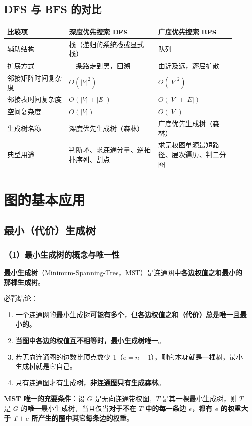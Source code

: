 \documentclass[11pt,openany,UTF8]{ctexbook}
\begin{document}
\subsection{DFS 与 BFS 的对比}

\begingroup\small\setlength{\tabcolsep}{4.0pt}
\begin{longtable}{@{}L{0.2516\linewidth}L{0.3654\linewidth}L{0.3115\linewidth}@{}}
\toprule
\textbf{比较项} & \textbf{深度优先搜索 DFS} & \textbf{广度优先搜索 BFS} \\
\midrule
\endhead
辅助结构 & 栈（递归的系统栈或显式栈） & 队列 \\
扩展方式 & 一条路走到黑，回溯 & 由近及远，逐层扩散 \\
邻接矩阵时间复杂度 & $O(\lvert V\rvert^{2})$ & $O(\lvert V\rvert^{2})$ \\
邻接表时间复杂度 & $O(\lvert V\rvert+\lvert E\rvert)$ & $O(\lvert V\rvert+\lvert E\rvert)$ \\
空间复杂度 & $O(\lvert V\rvert)$ & $O(\lvert V\rvert)$ \\
生成树名称 & 深度优先生成树（森林） & 广度优先生成树（森林） \\
典型用途 & 判断环、求连通分量、逆拓扑序列、割点 & 求无权图单源最短路径、层次遍历、判二分图 \\
\bottomrule
\end{longtable}
\endgroup

\section{图的基本应用}

\subsection{最小（代价）生成树}

\subsubsection{（1）最小生成树的概念与唯一性}

\textbf{最小生成树}（Minimum-Spanning-Tree，MST）是连通网中\textbf{各边权值之和最小的那棵生成树}。

必背结论：

\begin{enumerate}
\item 一个连通网的最小生成树\textbf{可能有多个}，但\textbf{各边权值之和（代价）总是唯一且最小的}。
\item \textbf{当图中各边的权值互不相等时，最小生成树唯一}。
\item 若无向连通图的边数比顶点数少 1（$e=n-1$），则它本身就是一棵树，最小生成树就是它自己。
\item 只有连通图才有生成树，\textbf{非连通图只有生成森林}。
\end{enumerate}
\textbf{MST 唯一的充要条件}：设 $G$ 是无向连通带权图，$T$ 是其一棵最小生成树，则 $T$ 是 $G$ 的\textbf{唯一}最小生成树，当且仅当\textbf{对于不在 $T$ 中的每一条边 $e$，都有 $e$ 的权重大于 $T+e$ 所产生的圈中其它每条边的权重}。
\end{document}
